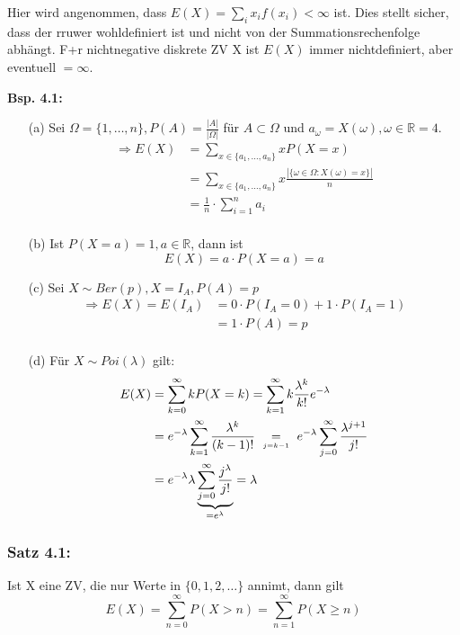 \documentclass[a4paper,11pt]{article}
\newcommand\jekmo{\underset{\mathclap{\scriptscriptstyle j=k-1}}{=}}
\begin{document}
\vspace{6pt}
\noindent Hier wird angenommen, dass $E(X)=\sum_{i}x_if(x_i)<\infty$ ist. Dies stellt sicher, dass der rruwer wohldefiniert ist und nicht von der Summationsrechenfolge abhängt. 
F+r nichtnegative diskrete ZV X ist $E(X)$ immer nichtdefiniert, aber eventuell $=\infty$.

\vspace{6pt}
\noindent\textbf{Bsp. 4.1:}
\begin{itemize}
\item[(a)] Sei $\Omega=\{1,\dots,n\}, P(A)=\frac{|A|}{|\Omega|}$ für $A\subset\Omega$ und $a_\omega=X(\omega),\omega\in\mathbb{R}=4$.
\newline \begin{align*}
\Rightarrow E(X) &= \sum_{x\in\{a_1,\dots,a_n\}}xP(X=x)\\
&= \sum_{x\in\{a_1,\dots,a_n\}}x\frac{|\{\omega\in\Omega:X(\omega)=x\}|}{n}\\
&= \frac{1}{n}\cdot\sum_{i=1}^{n}a_i\\
\end{align*}
\item[(b)] Ist $P(X=a)=1, a\in\mathbb{R}$, dann ist 
\[E(X)=a\cdot P(X=a)=a\]
\item[(c)] Sei $X\sim Ber(p), X=I_A, P(A)=p$
\begin{align*}
\Rightarrow E(X)=E(I_A) &= 0\cdot P(I_A=0)+1\cdot P(I_A=1)\\
&= 1\cdot P(A)=p\\
\end{align*}
\item[(d)] Für $X\sim Poi(\lambda)$ gilt: 
\begin{align*}
E(X) &= \sum_{k=0}^{\infty}kP(X=k) = \sum_{k=1}^{\infty}k\frac{\lambda^k}{k!}e^{-\lambda}\\
&= e^{-\lambda}\sum_{k=1}^{\infty}\frac{\lambda^k}{(k-1)!} \hspace{10pt} \jekmo \hspace{10pt} e^{-\lambda}\sum_{j=0}^{\infty}\frac{\lambda^{j+1}}{j!}\\
&= e^{-\lambda}\lambda\underbrace{\sum_{j=0}^{\infty}\frac{j^\lambda}{j!}}_{= e^\lambda}=\lambda
\end{align*}
\end{itemize}

\subsubsection{Satz 4.1:}
Ist X eine ZV, die nur Werte in $\{0,1,2,\dots\}$ annimt, dann gilt
\[E(X)=\sum_{n=0}^{\infty}P(X>n)=\sum_{n=1}^{\infty}P(X\geq n)\]
\end{document}

